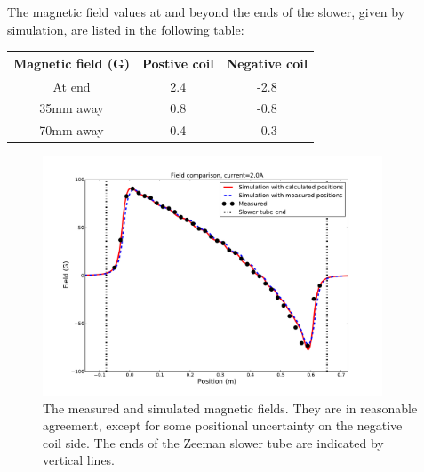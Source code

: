 \documentclass[12pt,a4paper]{article}
\begin{document}
The magnetic field values at and beyond the ends of the slower, given by simulation, are listed in the following table:

\begin{center}
\begin{tabular}{|c|c|c|}
\hline 
Magnetic field (G) & Postive coil & Negative coil \\ 
\hline 
At end & 2.4 & -2.8 \\ 
\hline 
35mm away & 0.8 & -0.8 \\ 
\hline 
70mm away & 0.4 & -0.3 \\ 
\hline 
\end{tabular} 
\end{center}

\begin{figure}[htb]
\centering
\includegraphics[width=0.9\textwidth]{slowerfield3}
\caption{The measured and simulated magnetic fields. They are in reasonable agreement, except for some positional uncertainty on the negative coil side. The ends of the Zeeman slower tube are indicated by vertical lines.}
\label{fig:slowerfield}
\end{figure}




\end{document}
